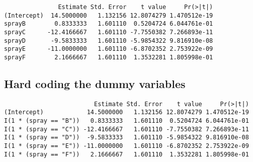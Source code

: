 \documentclass[12pt,openright,oneside,a4paper,chapter=TITLE,section=TITLE,subsection=Title,english,french,spanish,portugues,sumario=tradicional]{04-class-files/abntex2}
\newenvironment{Shaded}{\begin{snugshade}}{\end{snugshade}}
\newcommand{\DataTypeTok}[1]{\textcolor[rgb]{0.13,0.29,0.53}{#1}}
\newcommand{\DecValTok}[1]{\textcolor[rgb]{0.00,0.00,0.81}{#1}}
\newcommand{\KeywordTok}[1]{\textcolor[rgb]{0.13,0.29,0.53}{\textbf{#1}}}
\newcommand{\NormalTok}[1]{#1}
\newcommand{\OperatorTok}[1]{\textcolor[rgb]{0.81,0.36,0.00}{\textbf{#1}}}
\newcommand{\StringTok}[1]{\textcolor[rgb]{0.31,0.60,0.02}{#1}}
\begin{document}
\begin{verbatim}
               Estimate Std. Error    t value     Pr(>|t|)
(Intercept)  14.5000000   1.132156 12.8074279 1.470512e-19
sprayB        0.8333333   1.601110  0.5204724 6.044761e-01
sprayC      -12.4166667   1.601110 -7.7550382 7.266893e-11
sprayD       -9.5833333   1.601110 -5.9854322 9.816910e-08
sprayE      -11.0000000   1.601110 -6.8702352 2.753922e-09
sprayF        2.1666667   1.601110  1.3532281 1.805998e-01
\end{verbatim}

\hypertarget{hard-coding-the-dummy-variables}{%
\subsection{Hard coding the dummy variables}\label{hard-coding-the-dummy-variables}}

\begin{Shaded}
\end{Shaded}

\begin{verbatim}
                         Estimate Std. Error    t value     Pr(>|t|)
(Intercept)            14.5000000   1.132156 12.8074279 1.470512e-19
I(1 * (spray == "B"))   0.8333333   1.601110  0.5204724 6.044761e-01
I(1 * (spray == "C")) -12.4166667   1.601110 -7.7550382 7.266893e-11
I(1 * (spray == "D"))  -9.5833333   1.601110 -5.9854322 9.816910e-08
I(1 * (spray == "E")) -11.0000000   1.601110 -6.8702352 2.753922e-09
I(1 * (spray == "F"))   2.1666667   1.601110  1.3532281 1.805998e-01
\end{verbatim}
\end{document}
